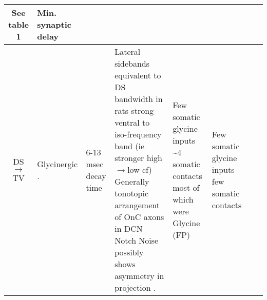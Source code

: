 \begin{longtable}{cXXXXXXX}
See table 1 \citep{SmithRhode:1989}     
& 
Min. synaptic delay 
\\ \midrule
DS\ensuremath{\rightarrow}TV                        
& %
Glycinergic \citep{DoucetRyugoEtAl:1999,OertelWuEtAl:1990,OstapoffMorestEtAl1999,SpirouDavisEtAl:1999,ZhangOertel:1993}.                                                              
& 
6-13 msec decay time \citep{AwatramaniTurecekEtAl:2005,FerragamoGoldingEtAl:1998a,HartyManis:1996,HartyManis:1998,LeaoOleskevichEtAl:2004}
                                                                          
& 
Lateral sidebands equivalent to DS bandwidth
\citep{OstapoffMorestEtAl:1999,SpirouDavisEtAl:1999} 
in rats strong ventral to iso-frequency band (ie stronger high \ensuremath{\rightarrow}low cf)
\citep{DoucetRyugoEtAl:1999,FriedlandPongstapornEtAl:2003} 
Generally tonotopic arrangement of OnC axons in DCN \citep{ArnottWallaceEtAl:2004}
Notch Noise possibly shows asymmetry in projection \citep{ReissYoung:2005}.      
& Few
somatic glycine inputs
\citep{OsenOttersenEtAl:1990,OstapoffMorestEtAl1999:1999,ZhangOertel:1993}
\~{}4 somatic contacts most of which were Glycine (FP) \citep{Alibardi:1999}
                                                                          
& 
Few somatic glycine inputs \citep{OsenOttersenEtAl:1990,OstapoffMorestEtAl:1999,ZhangOertel:1993} 
few  somatic contacts \citep{Alibardi:1999}                   


\end{longtable}
